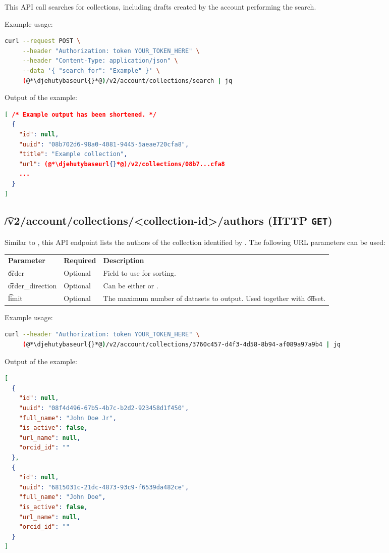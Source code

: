   This API call searches for collections, including drafts created
  by the account performing the search.

  Example usage:
\begin{lstlisting}[language=bash]
curl --request POST \
     --header "Authorization: token YOUR_TOKEN_HERE" \
     --header "Content-Type: application/json" \
     --data '{ "search_for": "Example" }' \
     (@*\djehutybaseurl{}*@)/v2/account/collections/search | jq
\end{lstlisting}

  Output of the example:
\begin{lstlisting}[language=JSON]
[ /* Example output has been shortened. */
  {
    "id": null,
    "uuid": "08b702d6-98a0-4081-9445-5aeae720cfa8",
    "title": "Example collection",
    "url": (@*\djehutybaseurl{}*@)/v2/collections/08b7...cfa8
    ...
  }
]
\end{lstlisting}

\subsection{\t{/v2/account/collections/<collection-id>/authors} (HTTP \texttt{GET})}
\label{sec:api-v2-collections-authors}

  Similar to , this API endpoint lists the
  authors of the collection identified by \code{collection-id}.
  The following URL parameters can be used:

\begin{tabularx}{\textwidth}{*{2}{!{\VRule[-1pt]}l}!{\VRule[-1pt]}X}
  \headrow
  \textbf{Parameter}   & \textbf{Required} & \textbf{Description}\\
  \t{order}            & Optional & Field to use for sorting.\\
  \t{order\_direction} & Optional & Can be either \code{asc} or .\\
  \t{limit}            & Optional & The maximum number of datasets to output.
                                    Used together with \t{offset}.
\end{tabularx}

  Example usage:
\begin{lstlisting}[language=bash]
curl --header "Authorization: token YOUR_TOKEN_HERE" \
     (@*\djehutybaseurl{}*@)/v2/account/collections/3760c457-d4f3-4d58-8b94-af089a97a9b4 | jq
\end{lstlisting}

  Output of the example:
\begin{lstlisting}[language=JSON]
[
  {
    "id": null,
    "uuid": "08f4d496-67b5-4b7c-b2d2-923458d1f450",
    "full_name": "John Doe Jr",
    "is_active": false,
    "url_name": null,
    "orcid_id": ""
  },
  {
    "id": null,
    "uuid": "6815031c-21dc-4873-93c9-f6539da482ce",
    "full_name": "John Doe",
    "is_active": false,
    "url_name": null,
    "orcid_id": ""
  }
]
\end{lstlisting}


